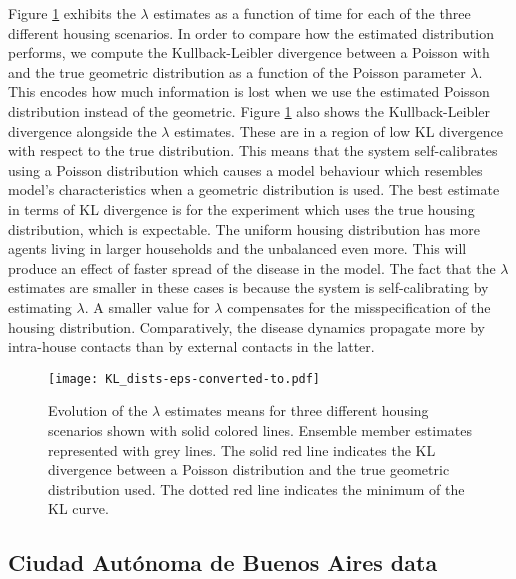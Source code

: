 \documentclass[11pt,a4paper]{article}
\begin{document}
Figure \ref{fig:KL} exhibits the $\lambda$ estimates as a function of time for each of the three different housing scenarios. In order to compare how the estimated distribution performs, we compute the Kullback-Leibler divergence between a Poisson with and the true geometric distribution as a function of the Poisson parameter $\lambda$. This encodes how much information is lost when we use the estimated Poisson distribution instead of the geometric. Figure \ref{fig:KL} also shows the Kullback-Leibler divergence alongside the $\lambda$ estimates. These are in a region of low KL divergence with respect to the true distribution. This means that the system self-calibrates using a Poisson distribution which causes a model behaviour which resembles model's characteristics when a geometric distribution is used. The best estimate in terms of KL divergence is for the experiment which uses the true housing distribution, which is expectable. The uniform housing distribution has more agents living in larger households and the unbalanced even more. This will produce an effect of faster spread of the disease in the model. The fact that the $\lambda$ estimates are smaller in these cases is because the system is self-calibrating by estimating $\lambda$. A smaller value for $\lambda$  compensates for the misspecification of the housing distribution. Comparatively, the disease dynamics propagate more by intra-house contacts than by external contacts in the latter. 

\begin{figure}
    \captionsetup{width=0.5\textwidth}
    \centering
    \texttt{[image: KL\_dists-eps-converted-to.pdf]}
    \caption{Evolution of the $\lambda$ estimates means for three different housing scenarios shown with solid colored lines. Ensemble member estimates represented with grey lines. The solid red line indicates the KL divergence between a Poisson distribution and the true geometric distribution used. The dotted red line indicates the minimum of the KL curve.}
    \label{fig:KL}
\end{figure}

\subsection{Ciudad Autónoma de Buenos Aires data} \label{sec:caba}
\end{document}
